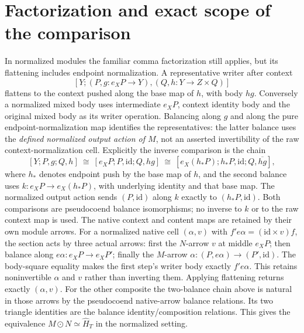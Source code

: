 \documentclass[11pt]{article}
\begin{document}
\section{Factorization and exact scope of the comparison}
In normalized modules the familiar comma factorization still applies, but its flattening includes endpoint normalization. A representative writer after context
\[
 [Y;(P,g:e_XP\to Y),(Q,h:Y\to Z\times Q)]
\]
flattens to the context pushed along the base map of $h$, with body $hg$. Conversely a normalized mixed body uses intermediate $e_XP$, context identity body and the original mixed body as its writer operation. Balancing along $g$ and along the pure endpoint-normalization map identifies the representatives: the latter balance uses the \emph{defined normalized output action of $M$}, not an asserted invertibility of the raw context-normalization cell. Explicitly the inverse comparison is the chain
\[
 [Y;P,g;Q,h]\ \cong\ [e_XP;P,\mathrm{id};Q,hg]
 \ \cong\ [e_X(h_*P);h_*P,\mathrm{id};Q,\overline{hg}],
\]
where $h_*$ denotes endpoint push by the base map of $h$, and the second balance uses $k:e_XP\to e_X(h_*P)$, with underlying identity and that base map. The normalized output action sends $(P,\mathrm{id})$ along $k$ exactly to $(h_*P,\mathrm{id})$. Both comparisons are pseudocoend balance isomorphisms; no inverse to $k$ or to the raw context map is used. The native context and content maps are retained by their own module arrows. For a normalized native cell $(\alpha,v)$ with $f'e\alpha=(\mathrm{id}\times v)f$, the section acts by three actual arrows: first the $N$-arrow $v$ at middle $e_XP$; then balance along $e\alpha:e_XP\to e_XP'$; finally the $M$-arrow $\alpha:(P,e\alpha)\to(P',\mathrm{id})$. The body-square equality makes the first step's writer body exactly $f'e\alpha$. This retains noninvertible $\alpha$ and $v$ rather than inverting them. Applying flattening returns exactly $(\alpha,v)$. For the other composite the two-balance chain above is natural in those arrows by the pseudocoend native-arrow balance relations. Its two triangle identities are the balance identity/composition relations. This gives the equivalence $M\odot N\simeq\widehat H_T$ in the normalized setting.
\end{document}
